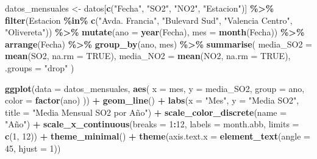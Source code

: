 \documentclass[notspecified,article,submit,moreauthors,pdftex]{Definitions/mdpi}
\newenvironment{Shaded}{\begin{snugshade}}{\end{snugshade}}
\newcommand{\AttributeTok}[1]{\textcolor[rgb]{0.13,0.29,0.53}{#1}}
\newcommand{\ConstantTok}[1]{\textcolor[rgb]{0.56,0.35,0.01}{#1}}
\newcommand{\DecValTok}[1]{\textcolor[rgb]{0.00,0.00,0.81}{#1}}
\newcommand{\FunctionTok}[1]{\textcolor[rgb]{0.13,0.29,0.53}{\textbf{#1}}}
\newcommand{\NormalTok}[1]{#1}
\newcommand{\OtherTok}[1]{\textcolor[rgb]{0.56,0.35,0.01}{#1}}
\newcommand{\SpecialCharTok}[1]{\textcolor[rgb]{0.81,0.36,0.00}{\textbf{#1}}}
\newcommand{\StringTok}[1]{\textcolor[rgb]{0.31,0.60,0.02}{#1}}
\begin{document}
\begin{Shaded}
\begin{Highlighting}[]
\NormalTok{datos\_mensuales }\OtherTok{\textless{}{-}}\NormalTok{ datos[}\FunctionTok{c}\NormalTok{(}\StringTok{"Fecha"}\NormalTok{, }\StringTok{"SO2"}\NormalTok{, }\StringTok{"NO2"}\NormalTok{, }\StringTok{"Estacion"}\NormalTok{)] }\SpecialCharTok{\%\textgreater{}\%}
  \FunctionTok{filter}\NormalTok{(Estacion }\SpecialCharTok{\%in\%} \FunctionTok{c}\NormalTok{(}\StringTok{"Avda. Francia"}\NormalTok{, }\StringTok{"Bulevard Sud"}\NormalTok{, }\StringTok{"Valencia Centro"}\NormalTok{, }\StringTok{"Olivereta"}\NormalTok{)) }\SpecialCharTok{\%\textgreater{}\%}
  \FunctionTok{mutate}\NormalTok{(}\AttributeTok{ano =} \FunctionTok{year}\NormalTok{(Fecha), }\AttributeTok{mes =} \FunctionTok{month}\NormalTok{(Fecha)) }\SpecialCharTok{\%\textgreater{}\%}
  \FunctionTok{arrange}\NormalTok{(Fecha) }\SpecialCharTok{\%\textgreater{}\%}
  \FunctionTok{group\_by}\NormalTok{(ano, mes) }\SpecialCharTok{\%\textgreater{}\%}
  \FunctionTok{summarise}\NormalTok{(}
    \AttributeTok{media\_SO2 =} \FunctionTok{mean}\NormalTok{(SO2, }\AttributeTok{na.rm =} \ConstantTok{TRUE}\NormalTok{),}
    \AttributeTok{media\_NO2 =} \FunctionTok{mean}\NormalTok{(NO2, }\AttributeTok{na.rm =} \ConstantTok{TRUE}\NormalTok{),}
    \AttributeTok{.groups =} \StringTok{"drop"}
\NormalTok{  )}

\FunctionTok{ggplot}\NormalTok{(}\AttributeTok{data =}\NormalTok{ datos\_mensuales, }\FunctionTok{aes}\NormalTok{(}
  \AttributeTok{x =}\NormalTok{ mes,}
  \AttributeTok{y =}\NormalTok{ media\_SO2,}
  \AttributeTok{group =}\NormalTok{ ano,}
  \AttributeTok{color =} \FunctionTok{factor}\NormalTok{(ano)}
\NormalTok{)) }\SpecialCharTok{+}
  \FunctionTok{geom\_line}\NormalTok{() }\SpecialCharTok{+}
  \FunctionTok{labs}\NormalTok{(}\AttributeTok{x =} \StringTok{"Mes"}\NormalTok{, }\AttributeTok{y =} \StringTok{"Media SO2"}\NormalTok{, }\AttributeTok{title =} \StringTok{"Media Mensual SO2 por Año"}\NormalTok{) }\SpecialCharTok{+}
  \FunctionTok{scale\_color\_discrete}\NormalTok{(}\AttributeTok{name =} \StringTok{"Año"}\NormalTok{) }\SpecialCharTok{+}
  \FunctionTok{scale\_x\_continuous}\NormalTok{(}\AttributeTok{breaks =} \DecValTok{1}\SpecialCharTok{:}\DecValTok{12}\NormalTok{,}
                     \AttributeTok{labels =}\NormalTok{ month.abb,}
                     \AttributeTok{limits =} \FunctionTok{c}\NormalTok{(}\DecValTok{1}\NormalTok{, }\DecValTok{12}\NormalTok{)) }\SpecialCharTok{+}
  \FunctionTok{theme\_minimal}\NormalTok{() }\SpecialCharTok{+}
  \FunctionTok{theme}\NormalTok{(}\AttributeTok{axis.text.x =} \FunctionTok{element\_text}\NormalTok{(}\AttributeTok{angle =} \DecValTok{45}\NormalTok{, }\AttributeTok{hjust =} \DecValTok{1}\NormalTok{))}
\end{Highlighting}
\end{Shaded}
\end{document}
